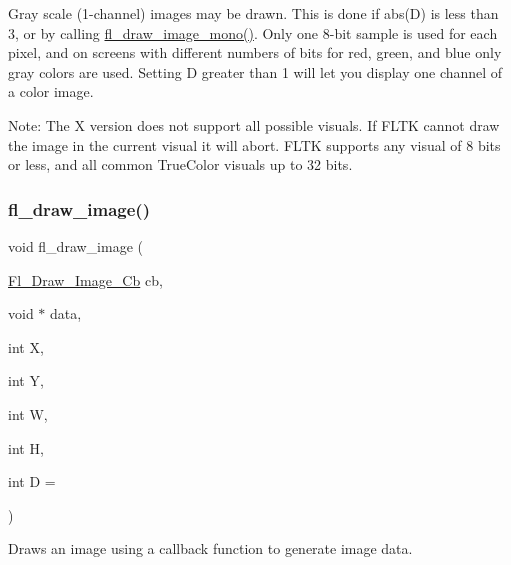 Gray scale (1-\/channel) images may be drawn. This is done if {\ttfamily abs(\+D)} is less than 3, or by calling \hyperlink{group__fl__drawings_gafb938dc103b5c3d9187a538667237d36}{fl\+\_\+draw\+\_\+image\+\_\+mono()}. Only one 8-\/bit sample is used for each pixel, and on screens with different numbers of bits for red, green, and blue only gray colors are used. Setting {\ttfamily D} greater than 1 will let you display one channel of a color image.

\begin{DoxyParagraph}{Note\+:}
The X version does not support all possible visuals. If F\+L\+TK cannot draw the image in the current visual it will abort. F\+L\+TK supports any visual of 8 bits or less, and all common True\+Color visuals up to 32 bits. 
\end{DoxyParagraph}
\mbox{\label{group__fl__drawings_ga5b8f9bd2d3130529812dcc2c057eee35}} 
\subsubsection{\texorpdfstring{fl\+\_\+draw\+\_\+image()}{fl\_draw\_image()}\hspace{0.1cm}{\footnotesize\ttfamily [2/2]}}
{\footnotesize\ttfamily void fl\+\_\+draw\+\_\+image (\begin{DoxyParamCaption}\item[{\hyperlink{_fl___device_8_h_a702e2cb8dd542dda67e5c206b0d73a07}{Fl\+\_\+\+Draw\+\_\+\+Image\+\_\+\+Cb}}]{cb,  }\item[{void $\ast$}]{data,  }\item[{int}]{X,  }\item[{int}]{Y,  }\item[{int}]{W,  }\item[{int}]{H,  }\item[{int}]{D = {} }\end{DoxyParamCaption})\hspace{0.3cm}{\ttfamily [inline]}}

Draws an image using a callback function to generate image data.

